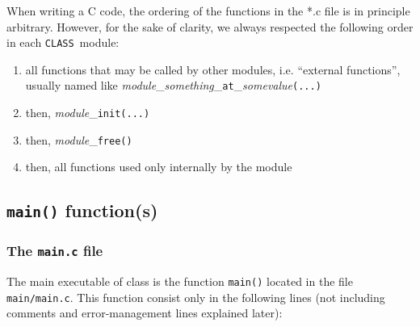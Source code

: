 \documentclass{article}
\newcommand\CLASS{{\tt CLASS}~}
\begin{document}
When writing a C code, the ordering of the functions in the *.c file is in principle arbitrary. However, for the sake of clarity, we always respected the following order in each \CLASS module:

\begin{enumerate}
\item all functions that may be called by other modules, i.e. ``external functions'',  usually named like {\it module}\_{\it something}\_{\tt at}\_{\it somevalue}{\tt(...)}
\item then, {\it module}\_{\tt init(...)}
\item then, {\it module}\_{\tt free()}
\item then, all functions used only internally by the module
\end{enumerate}

\subsection{{\tt main()} function(s)}

\subsubsection{The {\tt main.c} file}

The main executable of {\sc class} is the function {\tt main()} located in the file {\tt main/main.c}.
This function consist only in the 
following lines
(not including comments and error-management lines explained later):

\vspace{0.5cm}
\end{document}
